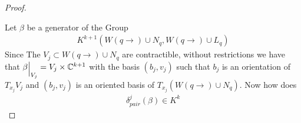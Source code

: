 \begin{proof}
\begin{center}
\end{center}


 Let $\beta$ be a generator of the Group 
 \begin{align*}
     K^{k+1}(W(q\to)\cup N_q,W(q\to)\cup L_q)
 \end{align*} Since The $V_j\subset W(q\to)\cup N_q$ are contractible, without restrictions we have that $\beta\einsch{V_j}=V_j\times \C^{k+1}$ with the basis $(b_j,v_j)$ such that $b_j$ is an orientation of $T_{x_j}V_j$ and $(b_j,v_j)$ is an oriented basis of $T_{x_j} (W(q\to)\cup N_q)$. Now how does 
 \begin{align*}
     \delta^j_{pair} (\beta)\in K^{k}
 \end{align*}
\end{proof}
